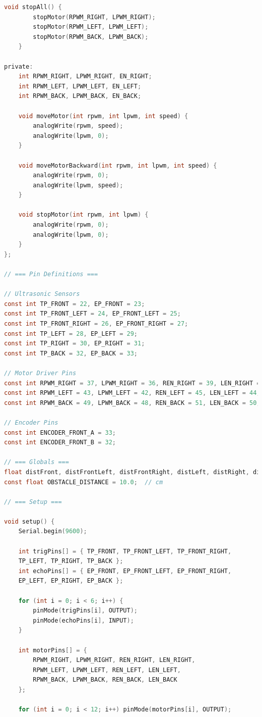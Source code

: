 \documentclass{article}
\begin{document}
\begin{lstlisting}[language=C, basicstyle=\ttfamily\footnotesize, frame=single, xleftmargin=10mm, xrightmargin=10mm]
    void stopAll() {
        stopMotor(RPWM_RIGHT, LPWM_RIGHT);
        stopMotor(RPWM_LEFT, LPWM_LEFT);
        stopMotor(RPWM_BACK, LPWM_BACK);
    }

private:
    int RPWM_RIGHT, LPWM_RIGHT, EN_RIGHT;
    int RPWM_LEFT, LPWM_LEFT, EN_LEFT;
    int RPWM_BACK, LPWM_BACK, EN_BACK;

    void moveMotor(int rpwm, int lpwm, int speed) {
        analogWrite(rpwm, speed);
        analogWrite(lpwm, 0);
    }

    void moveMotorBackward(int rpwm, int lpwm, int speed) {
        analogWrite(rpwm, 0);
        analogWrite(lpwm, speed);
    }

    void stopMotor(int rpwm, int lpwm) {
        analogWrite(rpwm, 0);
        analogWrite(lpwm, 0);
    }
};

// === Pin Definitions ===

// Ultrasonic Sensors
const int TP_FRONT = 22, EP_FRONT = 23;
const int TP_FRONT_LEFT = 24, EP_FRONT_LEFT = 25;
const int TP_FRONT_RIGHT = 26, EP_FRONT_RIGHT = 27;
const int TP_LEFT = 28, EP_LEFT = 29;
const int TP_RIGHT = 30, EP_RIGHT = 31;
const int TP_BACK = 32, EP_BACK = 33;

// Motor Driver Pins
const int RPWM_RIGHT = 37, LPWM_RIGHT = 36, REN_RIGHT = 39, LEN_RIGHT = 38;
const int RPWM_LEFT = 43, LPWM_LEFT = 42, REN_LEFT = 45, LEN_LEFT = 44;
const int RPWM_BACK = 49, LPWM_BACK = 48, REN_BACK = 51, LEN_BACK = 50;

// Encoder Pins
const int ENCODER_FRONT_A = 33;
const int ENCODER_FRONT_B = 32;

// === Globals ===
float distFront, distFrontLeft, distFrontRight, distLeft, distRight, distBack;
const float OBSTACLE_DISTANCE = 10.0;  // cm

// === Setup ===

void setup() {
    Serial.begin(9600);

    int trigPins[] = { TP_FRONT, TP_FRONT_LEFT, TP_FRONT_RIGHT, 
    TP_LEFT, TP_RIGHT, TP_BACK };
    int echoPins[] = { EP_FRONT, EP_FRONT_LEFT, EP_FRONT_RIGHT, 
    EP_LEFT, EP_RIGHT, EP_BACK };

    for (int i = 0; i < 6; i++) {
        pinMode(trigPins[i], OUTPUT);
        pinMode(echoPins[i], INPUT);
    }

    int motorPins[] = {
        RPWM_RIGHT, LPWM_RIGHT, REN_RIGHT, LEN_RIGHT,
        RPWM_LEFT, LPWM_LEFT, REN_LEFT, LEN_LEFT,
        RPWM_BACK, LPWM_BACK, REN_BACK, LEN_BACK
    };

    for (int i = 0; i < 12; i++) pinMode(motorPins[i], OUTPUT);


\end{lstlisting}
\end{document}
